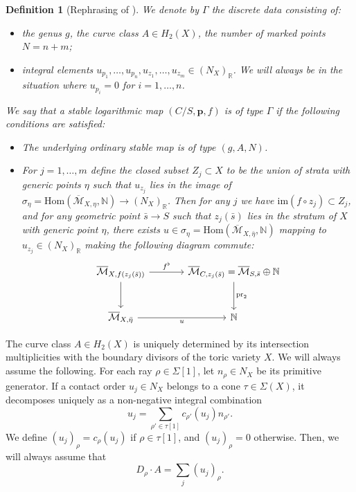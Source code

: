 \documentclass{article}
\def\N{{\mathbb{N}}}
\def\oM{\overline{\mathcal{M}}}
\newtheorem{definition}{Definition}[section]
\begin{document}
\begin{definition}[Rephrasing of {\cite[Definition 2.15]{ACGSI}}]
We denote by $\Gamma$ the discrete data consisting of:
\begin{itemize}
    \item the genus $g$, the curve class $A \in H_2(X)$, the number of marked points $N=n+m$;
    \item integral elements
    $
    u_{p_1}, \ldots, u_{p_n}, u_{z_1},\ldots,u_{z_{m}} \in (N_X)_{\mathbb{R}}
    $. We will always be in the situation where $u_{p_i}=0$ for $i=1,\ldots,n$.
\end{itemize}

We say that a stable logarithmic map $(C/S, \mathbf{p}, f)$ is of type $\Gamma$ if the following conditions are satisfied:
\begin{itemize}
    \item The underlying ordinary stable map is of type $(g, A, N)$. 
    \item For $j=1,\ldots, m$ define the closed subset $Z_j \subset X$ to be the union of strata with generic points $\eta$ such that $u_{z_j}$ lies in the image of $\sigma_\eta= \mathrm{Hom}(\oM_{X,\eta},\N) \to (N_X)_{\mathbb{R}}$. Then for any $j$ we have $\mathrm{im}(f \circ z_j) \subset Z_j$, and for any geometric point $\bar{s} \to S$ such that $z_j(\bar{s})$ lies in the stratum of $X$ with generic point $\eta$, there exists $u \in \sigma_\eta = \mathrm{Hom}(\oM_{X,\bar{\eta}}, \mathbb{N})$ mapping to $u_{z_j} \in (N_X)_{\mathbb{R}}$ making the following diagram commute:
\[
\begin{tikzcd}[row sep=large, column sep=large]
\oM_{X,f(z_j(\bar{s}))} \arrow[r, "f^\flat"] \arrow[d] & \oM_{C,z_j(\bar{s})} = \oM_{S,\bar{s}} \oplus \mathbb{N} \arrow[d, "\mathrm{pr}_2"] \\
\oM_{X,\bar{\eta}} \arrow[r, "u"'] & \mathbb{N}
\end{tikzcd}
\]
\end{itemize}
\end{definition}




The curve class $A \in H_2(X)$ is uniquely determined by its intersection multiplicities with the boundary divisors of the toric variety $X$. We will always assume the following. For each ray $\rho \in \Sigma[1]$, let $n_\rho \in N_X$ be its primitive generator. If a contact order $u_j \in N_X$ belongs to a cone $\tau \in \Sigma(X)$, it decomposes uniquely as a non-negative integral combination 
\[
u_j = \sum_{\rho' \in \tau[1]} c_{\rho'}(u_j) n_{\rho'}.
\]
We define $(u_j)_\rho = c_\rho(u_j)$ if $\rho \in \tau[1]$, and $(u_j)_\rho = 0$ otherwise. Then, we will always assume that
\[
D_\rho \cdot A = \sum_{j} (u_j)_\rho.
\]
\end{document}

